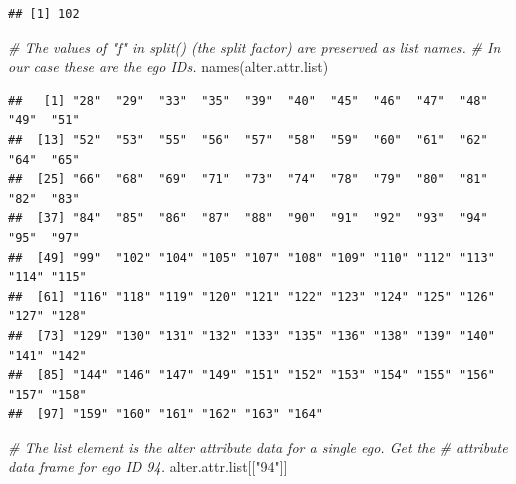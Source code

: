 \documentclass[
]{book}
\newenvironment{Shaded}{\begin{snugshade}}{\end{snugshade}}
\newcommand{\AttributeTok}[1]{\textcolor[rgb]{0.77,0.63,0.00}{#1}}
\newcommand{\CommentTok}[1]{\textcolor[rgb]{0.56,0.35,0.01}{\textit{#1}}}
\newcommand{\FunctionTok}[1]{\textcolor[rgb]{0.00,0.00,0.00}{#1}}
\newcommand{\NormalTok}[1]{#1}
\newcommand{\OtherTok}[1]{\textcolor[rgb]{0.56,0.35,0.01}{#1}}
\newcommand{\SpecialCharTok}[1]{\textcolor[rgb]{0.00,0.00,0.00}{#1}}
\newcommand{\StringTok}[1]{\textcolor[rgb]{0.31,0.60,0.02}{#1}}
\begin{document}
\begin{Shaded}
\end{Shaded}

\begin{verbatim}
## [1] 102
\end{verbatim}

\begin{Shaded}
\begin{Highlighting}[]
\CommentTok{\# The values of "f" in split() (the split factor) are preserved as list names.}
\CommentTok{\# In our case these are the ego IDs.}
\FunctionTok{names}\NormalTok{(alter.attr.list)}
\end{Highlighting}
\end{Shaded}

\begin{verbatim}
##   [1] "28"  "29"  "33"  "35"  "39"  "40"  "45"  "46"  "47"  "48"  "49"  "51" 
##  [13] "52"  "53"  "55"  "56"  "57"  "58"  "59"  "60"  "61"  "62"  "64"  "65" 
##  [25] "66"  "68"  "69"  "71"  "73"  "74"  "78"  "79"  "80"  "81"  "82"  "83" 
##  [37] "84"  "85"  "86"  "87"  "88"  "90"  "91"  "92"  "93"  "94"  "95"  "97" 
##  [49] "99"  "102" "104" "105" "107" "108" "109" "110" "112" "113" "114" "115"
##  [61] "116" "118" "119" "120" "121" "122" "123" "124" "125" "126" "127" "128"
##  [73] "129" "130" "131" "132" "133" "135" "136" "138" "139" "140" "141" "142"
##  [85] "144" "146" "147" "149" "151" "152" "153" "154" "155" "156" "157" "158"
##  [97] "159" "160" "161" "162" "163" "164"
\end{verbatim}

\begin{Shaded}
\begin{Highlighting}[]
\CommentTok{\# The list element is the alter attribute data for a single ego. Get the}
\CommentTok{\# attribute data frame for ego ID 94.}
\NormalTok{alter.attr.list[[}\StringTok{"94"}\NormalTok{]]}
\end{Highlighting}
\end{Shaded}
\end{document}
